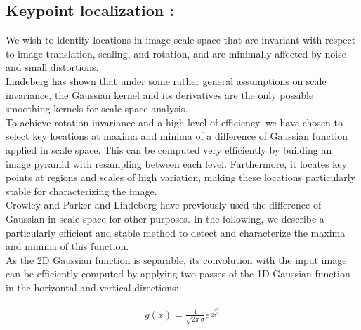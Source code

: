\subsection{Keypoint localization :}
We wish to identify locations in image scale space that are
invariant with respect to image translation, scaling, and rotation,
and are minimally affected by noise and small distortions.\\
Lindeberg \cite{e} has shown that under some rather
general assumptions on scale invariance, the Gaussian kernel
and its derivatives are the only possible smoothing kernels
for scale space analysis.\\
To achieve rotation invariance and a high level of efficiency,
we have chosen to select key locations at maxima
and minima of a difference of Gaussian function applied in
scale space. This can be computed very efﬁciently by building
an image pyramid with resampling between each level.
Furthermore, it locates key points at regions and scales of
high variation, making these locations particularly stable for
characterizing the image.\\ Crowley and Parker \cite{f} and Lindeberg
\cite{e} have previously used the difference-of-Gaussian in
scale space for other purposes. In the following, we describe
a particularly efﬁcient and stable method to detect and characterize
the maxima and minima of this function.\\
As the 2D Gaussian function is separable, its convolution
with the input image can be efﬁciently computed by applying
two passes of the 1D Gaussian function in the horizontal
and vertical directions:

\begin{align}
     g(x)  =\frac{1}{\sqrt{2\pi}\sigma} e^\frac{-x^2}{2\sigma^2}
\end{align}


